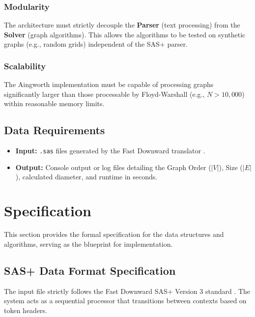 \documentclass[12pt,a4paper]{report}
\begin{document}
\subsection{Modularity}
The architecture must strictly decouple the \textbf{Parser} (text processing) from the \textbf{Solver} (graph algorithms). This allows the algorithms to be tested on synthetic graphs (e.g., random grids) independent of the SAS+ parser.

\subsection{Scalability}
The Aingworth implementation must be capable of processing graphs significantly larger than those processable by Floyd-Warshall (e.g., $N > 10,000$) within reasonable memory limits.

\section{Data Requirements}
\begin{itemize}
    \item \textbf{Input:} \texttt{.sas} files generated by the Fast Downward translator \cite{fastdownward}.
    \item \textbf{Output:} Console output or log files detailing the Graph Order ($|V|$), Size ($|E|$), calculated diameter, and runtime in seconds.
\end{itemize}

\chapter{Specification}
This section provides the formal specification for the data structures and algorithms, serving as the blueprint for implementation.

\section{SAS+ Data Format Specification}
The input file strictly follows the Fast Downward SAS+ Version 3 standard \cite{fastdownward, sasdocs}. The system acts as a sequential processor that transitions between contexts based on token headers.
\end{document}
